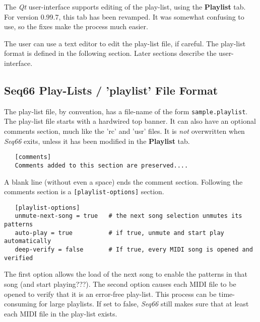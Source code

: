 
   The \textsl{Qt} user-interface supports editing of the play-list, using
   the \textbf{Playlist} tab.
   For version 0.99.7, this tab has been revamped.
   It was somewhat confusing to use, so the fixes make the
   process much easier.

   The user can use a text editor to edit the play-list file, if careful.
   The play-list format is defined in the following section.
   Later sections describe the user-interface.

\subsection{Seq66 Play-Lists / 'playlist' File Format}
\label{subsec:playlist_setup}

   The play-list file, by convention, has a file-name of the form
   \texttt{sample.playlist}.
   The play-list file starts with a hardwired top banner.
   It can also have an optional comments section, much
   like the 'rc' and 'usr' files.
   It is \textsl{not} overwritten when \textsl{Seq66} exits, unless it
   has been modified in the \textbf{Playlist} tab.

   \begin{verbatim}
   [comments]
   Comments added to this section are preserved....
   \end{verbatim}

   A blank line (without even a space) ends the comment section.
   Following the comments section is a \texttt{[playlist-options]} section.

   \begin{verbatim}
   [playlist-options]
   unmute-next-song = true   # the next song selection unmutes its patterns
   auto-play = true          # if true, unmute and start play automatically
   deep-verify = false       # If true, every MIDI song is opened and verified
   \end{verbatim}

   The first option allows the load of the next song to enable the patterns in
   that song (and start playing???).
   The second option causes each MIDI file to be opened to verify that it is an
   error-free play-list.  This process can be time-consuming for large
   playlists.  If set to false, \textsl{Seq66} still makes sure that
   at least each MIDI file in the play-list exists.

